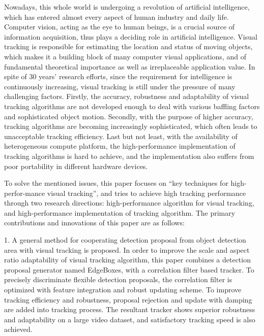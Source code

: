 \begin{eabstract}
Nowadays, this whole world is undergoing a revolution of artificial intelligence,
which has entered almost every aspect of human industry and daily life.
Computer vision, acting as the eye to human beings, is a crucial source of information acquisition,
thus plays a deciding role in artificial intelligence.
Visual tracking is responsible for estimating the location and status of moving objects,
which makes it a building block of many computer visual applications, and of 
fundamental theoretical importance as well as irreplaceable application value.
In spite of 30 years' research efforts, since the requirement for intelligence is continuously increasing,
visual tracking is still under the pressure of many challenging factors.
Firstly, the accuracy, robustness and adaptability of visual tracking algorithms are not developed enough to deal with various baffling factors and sophisticated object motion.
Secondly, with the purpose of higher accuracy, 
tracking algorithms are becoming increasingly sophisticated, 
which often leads to unacceptable tracking efficiency.
Last but not least, with the availability of heterogeneous compute platform,
the high-performance implementation of tracking algorithms is hard to achieve,
and the implementation also suffers from poor portability in different hardware devices.

To solve the mentioned issues, 
this paper focuses on ``key techniques for high-perfor-mance visual tracking'', 
and tries to achieve high tracking performance through two research directions:
high-performance algorithm for visual tracking, and high-performance implementation of tracking algorithm.
The primary contributions and innovations of this paper are as follows:

1. A general method for cooperating detection proposal from object detection area with
visual tracking is proposed. In order to improve the scale and aspect ratio adaptability
of visual tracking algorithm, this paper combines a detection proposal generator named 
EdgeBoxes, with a correlation filter based tracker.
To precisely discriminate flexible detection proposals, the correlation filter is optimized with
feature integration and robust updating scheme.
To improve tracking efficiency and robustness, proposal rejection and update with damping
are added into tracking process.
The resultant tracker shows superior robustness and adaptability on a large video dataset,
and satisfactory tracking speed is also achieved.


\end{eabstract}
